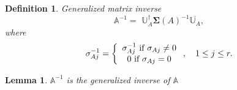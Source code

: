 \documentclass[aps,preprint]{revtex4}%
\newtheorem{definition}[theorem]{Definition}
\newtheorem{lemma}[theorem]{Lemma}
\begin{document}
\begin{definition}
Generalized matrix inverse%
\begin{equation}
\mathbb{A}^{-1}=\,\,\mathbb{U}_{A}^{\dagger}\mathbf{\Sigma}\left(  A\right)
^{-1}\overline{\mathbb{U}_{A}},
\end{equation}
where
\begin{equation}
\sigma_{Aj}^{-1}=\left\{
\begin{array}
[c]{c}%
\sigma_{Aj}^{-1}\text{ if }\sigma_{Aj}\neq0\\
0\text{ if }\sigma_{Aj}=0
\end{array}
\right.  ,\quad1\leq j\leq r.
\end{equation}

\end{definition}

\begin{lemma}
$\mathbb{A}^{-1}$ is the generalized inverse of $\mathbb{A}$
\end{lemma}
\end{document}
